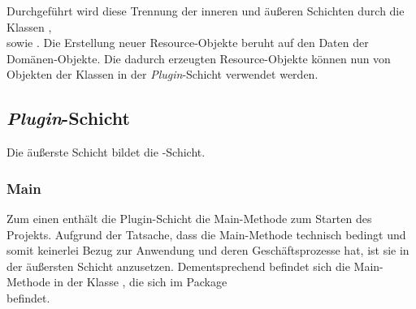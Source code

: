 Durchgeführt wird diese Trennung der inneren und äußeren Schichten durch die Klassen \href{https://github.com/lucasmerkel/dhbw-advancedswe-programmentwurf/blob/d5c89113d12c3b877ddc4d6a99225b277ddd468f/swe_programmentwurf/consumergoods-inventory-planner/1-cip-adapters/src/main/java/de/dhbw/cip/adapters/ConsumerGoodToConsumerGoodResourceMapper.java}{}, \\\href{https://github.com/lucasmerkel/dhbw-advancedswe-programmentwurf/blob/d5c89113d12c3b877ddc4d6a99225b277ddd468f/swe_programmentwurf/consumergoods-inventory-planner/1-cip-adapters/src/main/java/de/dhbw/cip/adapters/FridgeToFridgeResourceMapper.java}{} sowie \href{https://github.com/lucasmerkel/dhbw-advancedswe-programmentwurf/blob/d5c89113d12c3b877ddc4d6a99225b277ddd468f/swe_programmentwurf/consumergoods-inventory-planner/1-cip-adapters/src/main/java/de/dhbw/cip/adapters/FoodShelfToFoodShelfRessourceMapper.java}{}.
Die Erstellung neuer Resource-Objekte beruht auf den Daten der Domänen-Objekte.
Die dadurch erzeugten Resource-Objekte können nun von Objekten der Klassen in der \textit{Plugin}-Schicht verwendet werden.

\subsection*{\textit{Plugin}-Schicht}
Die äußerste Schicht bildet die \href{https://github.com/lucasmerkel/dhbw-advancedswe-programmentwurf/tree/main/swe_programmentwurf/consumergoods-inventory-planner/0-cip-plugins}{}-Schicht.

\subsubsection*{Main}
Zum einen enthält die Plugin-Schicht die Main-Methode zum Starten des Projekts.
Aufgrund der Tatsache, dass die Main-Methode technisch bedingt und somit keinerlei Bezug zur Anwendung und deren Geschäftsprozesse hat, ist sie in der äußersten Schicht anzusetzen.
Dementsprechend befindet sich die Main-Methode in der Klasse \href{https://github.com/lucasmerkel/dhbw-advancedswe-programmentwurf/blob/d5c89113d12c3b877ddc4d6a99225b277ddd468f/swe_programmentwurf/consumergoods-inventory-planner/0-cip-plugins/src/main/java/de/dhbw/cip/ConsumerInventoryPlannerApplication.java}{}, die sich im Package \\\href{https://github.com/lucasmerkel/dhbw-advancedswe-programmentwurf/tree/main/swe_programmentwurf/consumergoods-inventory-planner/0-cip-plugins/src/main/java/de/dhbw/cip}{} befindet.

